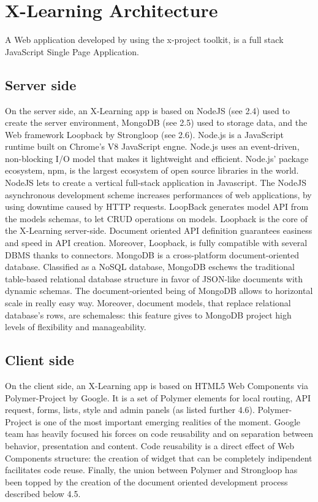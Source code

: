 \section{X-Learning  Architecture}
\label{sec:x-learning_architecture}

A Web application developed by using the x-project toolkit, is a full stack JavaScript  Single  Page Application.


\subsection{Server side}
\label{subsec:server_side}

On the server side, an X-Learning app is based on NodeJS (see 2.4) used to create the server environment, MongoDB (see 2.5) used to storage data, and the Web framework Loopback by Strongloop (see 2.6).
Node.js is a JavaScript runtime built on Chrome’s  V8  JavaScript  engne. Node.js uses an event-driven, non-blocking I/O model that makes it lightweight and efficient. Node.js’ package ecosystem, npm, is the largest ecosystem of open source libraries in the world. NodeJS lets to create a vertical full-stack application in Javascript. The NodeJS asynchronous development scheme increases performances of web applications, by using downtime caused  by  HTTP requests.
LoopBack generates model API from the models schemas, to let CRUD operations on models. Loopback is the core of the X-Learning server-side. Document oriented API definition guarantees easiness and speed in API creation. Moreover, Loopback, is fully compatible with several DBMS thanks to connectors.
MongoDB is a cross-platform document-oriented database.  Classified as a NoSQL database, MongoDB eschews the traditional table-based relational database structure in favor of JSON-like documents with dynamic schemas. The document-oriented being of MongoDB allows to horizontal scale in really easy way. Moreover, document models, that replace relational database’s rows, are schemaless: this feature gives to MongoDB project high levels of flexibility and manageability.

\subsection{Client side}
\label{subsec:client_side}

On the client side, an X-Learning app is based on HTML5 Web Components via Polymer-Project by Google. It is a set of Polymer elements for local routing, API request, forms, lists, style and admin panels (as listed further    4.6).
Polymer-Project is one of the most important emerging realities of the moment. Google team has heavily focused his forces on code reusability and on separation between behavior, presentation and content.  Code reusability is a direct effect of Web Components structure: the creation of widget that can be completely indipendent facilitates code reuse.
Finally, the union between Polymer and Strongloop has been topped by the creation of the document oriented development process described below 4.5.

